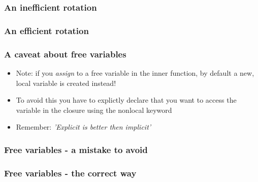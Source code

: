 \documentclass[9pt]{beamer}
\begin{document}
\begin{frame}
  \frametitle{An inefficient rotation}
  
\end{frame}


\begin{frame}
  \frametitle{An efficient rotation}
  
\end{frame}



\begin{frame}
  \frametitle{A caveat about free variables}
  \begin{itemize}  
    \item Note: if you \emph{assign} to a free variable in the inner function, 
          by default a new, local variable is created instead!
    \medskip
    \item To avoid this you have to explictly declare that you want to access the variable in
          the closure using the \alert{nonlocal} keyword
    \medskip
    \item Remember: \emph{'Explicit is better then implicit'}
  \end{itemize}
\end{frame}



\begin{frame}
  \frametitle{Free variables - a mistake to avoid}
  
\end{frame}


\begin{frame}
  \frametitle{Free variables - the correct way}
  
\end{frame}
\end{document}
